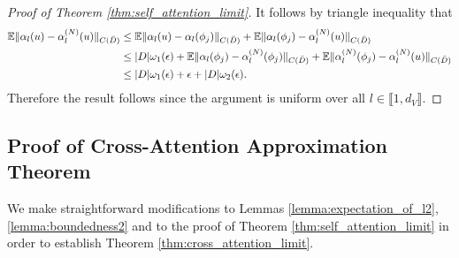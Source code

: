 \documentclass[twoside]{article}
\newcommand{\1}{\mathbbm{1}}
\newcommand{\range}[2]{\llbracket #1, #2 \rrbracket}
\newcommand{\E}{\mathbb{E}}
\begin{document}
\begin{proof}[Proof of Theorem \ref{thm:self_attention_limit}]
It follows by triangle inequality that
\begin{align*}
    \E \|\alpha_l (u) - \alpha_l^{(N)}(u)\|_{C(\Bar{D})} &\leq \E \|\alpha_l (u) - \alpha_l(\phi_j)\|_{C(\Bar{D})} + \E \|\alpha_l(\phi_j) - \alpha_l^{(N)}(u)\|_{C(\Bar{D})} \\
    &\leq |D| \omega_1(\epsilon) + \E \|\alpha_l(\phi_j) - \alpha_l^{(N)}(\phi_j)\|_{C(\Bar{D})} + \E \|\alpha_l^{(N)}(\phi_j) - \alpha_l^{(N)}(u)\|_{C(\Bar{D})} \\
    &\leq |D| \omega_1(\epsilon) + \epsilon + |D| \omega_2(\epsilon).
\end{align*}
Therefore the result follows since the argument is uniform over all $l \in \range{1}{d_V}$.
\end{proof}


\subsection{Proof of Cross-Attention Approximation Theorem}
\label{Appendix:cross}

We make straightforward modifications to Lemmas \ref{lemma:expectation_of_l2}, \ref{lemma:boundedness2} and to the proof of Theorem \ref{thm:self_attention_limit} in order to establish Theorem \ref{thm:cross_attention_limit}.
\end{document}
